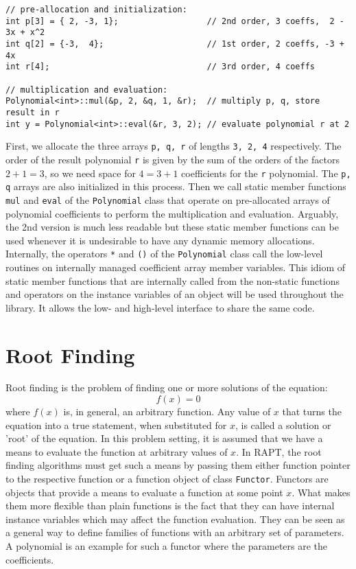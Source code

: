\begin{lstlisting}
// pre-allocation and initialization:
int p[3] = { 2, -3, 1};                  // 2nd order, 3 coeffs,  2 - 3x + x^2
int q[2] = {-3,  4};                     // 1st order, 2 coeffs, -3 + 4x
int r[4];                                // 3rd order, 4 coeffs

// multiplication and evaluation:
Polynomial<int>::mul(&p, 2, &q, 1, &r);  // multiply p, q, store result in r
int y = Polynomial<int>::eval(&r, 3, 2); // evaluate polynomial r at 2
\end{lstlisting}
First, we allocate the three arrays \texttt{p, q, r} of lengths \texttt{3, 2, 4} respectively. The order of the result polynomial \texttt{r} is given by the sum of the orders of the factors $2+1=3$, so we need space for $4=3+1$ coefficients for the \texttt{r} polynomial. The \texttt{p, q} arrays are also initialized in this process. Then we call static member functions \texttt{mul} and \texttt{eval} of the \texttt{Polynomial} class that operate on pre-allocated arrays of polynomial coefficients to perform the multiplication and evaluation. Arguably, the 2nd version is much less readable but these static member functions can be used whenever it is undesirable to have any dynamic memory allocations. Internally, the operators \texttt{*} and \texttt{()} of the \texttt{Polynomial} class call the low-level routines on internally managed coefficient array member variables. This idiom of static member functions that are internally called from the non-static functions and operators on the instance variables of an object will be used throughout the library. It allows the low- and high-level interface to share the same code.

\section{Root Finding}
Root finding is the problem of finding one or more solutions of the equation:
\begin{equation}
	f(x) = 0
\end{equation}
where $f(x)$ is, in general, an arbitrary function. Any value of $x$ that turns the equation into a true statement, when substituted for $x$, is called a solution or 'root' of the equation. In this problem setting, it is assumed that we have a means to evaluate the function at arbitrary values of $x$. In RAPT, the root finding algorithms must get such a means by passing them either function pointer to the respective function or a function object of class \texttt{Functor}. Functors are objects that provide a means to evaluate a function at some point $x$. What makes them more flexible than plain functions is the fact that they can have internal instance variables which may affect the function evaluation. They can be seen as a general way to define families of functions with an arbitrary set of parameters. A polynomial is an example for such a functor where the parameters are the coefficients.

